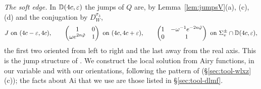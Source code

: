 \emph{The soft edge.} In $\mathbb D(4c,\varepsilon)$ the jumps of $Q$ are, by Lemma~\ref{lem:jumpsV}(a), (c), (d) and the conjugation
by $D_W^{\sigma_3}$,
\begin{equation}\label{eq:jumps-4c}
  J\ \text{on }(4c-\eps,4c),\qquad
  \begin{pmatrix}1&0\\\omega e^{2n\tvphi}&1\end{pmatrix}\ \text{on }(4c,4c+\eps),\qquad
  \begin{pmatrix}1&-\omega^{-1}e^{-2n\tvphi}\\0&1\end{pmatrix}\ \text{on }\Sigma^\pm_v\cap \mathbb D(4c,\eps),
\end{equation}
the first two oriented from left to right and the last away from the real axis. This is the jump structure of
\cite[(6.4)]{WLXZ}. We construct the local solution from Airy functions, in our variable and with our orientations,
following the pattern of \cite[(6.10)--(6.12)]{WLXZ} (\S\ref{sec:tool-wlxz}(c)); the facts about $\mathrm{Ai}$ that we
use are those listed in \S\ref{sec:tool-dlmf}.

